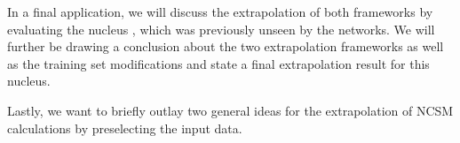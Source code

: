 In a final application, we will discuss the extrapolation of both frameworks by evaluating the nucleus , which was previously unseen by the networks.
We will further be drawing a conclusion about the two extrapolation frameworks as well as the training set modifications and state a final extrapolation result for this nucleus.

Lastly, we want to briefly outlay two general ideas for the extrapolation of NCSM calculations by preselecting the input data.
